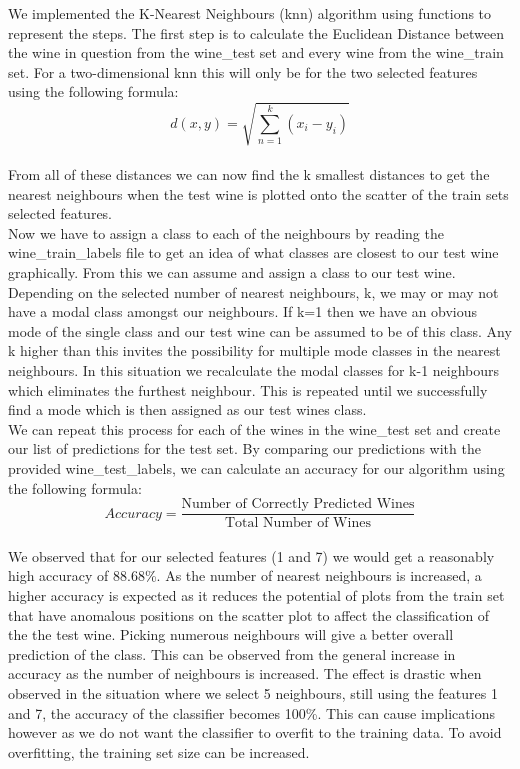 \documentclass[10pt]{article}
\begin{document}
We implemented the K-Nearest Neighbours (knn) algorithm using functions to represent the steps. The first step is to calculate the Euclidean Distance between the wine in question from the wine\_test set and every wine from the wine\_train set. For a two-dimensional knn this will only be for the two selected features using the following formula:
$$d(x,y) = \sqrt{\sum_{n=1}^{k} (x_i - y_i)}$$
\\
\noindent
From all of these distances we can now find the k smallest distances to get the nearest neighbours when the test wine is plotted onto the scatter of the train sets selected features.\\

\noindent
Now we have to assign a class to each of the neighbours by reading the wine\_train\_labels file to get an idea of what classes are closest to our test wine graphically. From this we can assume and assign a class to our test wine. Depending on the selected number of nearest neighbours, k, we may or may not have a modal class amongst our neighbours. If k=1 then we have an obvious mode of the single class and our test wine can be assumed to be of this class. Any k higher than this invites the possibility for multiple mode classes in the nearest neighbours. In this situation we recalculate the modal classes for k-1 neighbours which eliminates the furthest neighbour. This is repeated until we successfully find a mode which is then assigned as our test wines class.\\

\noindent
We can repeat this process for each of the wines in the wine\_test set and create our list of predictions for the test set. By comparing our predictions with the provided wine\_test\_labels, we can calculate an accuracy for our algorithm using the following formula:
$$Accuracy = \frac{\text{Number of Correctly Predicted Wines}}{\text{Total Number of Wines}}$$
\\
\noindent
We observed that for our selected features (1 and 7) we would get a reasonably high accuracy of 88.68\%. As the number of nearest neighbours is increased, a higher accuracy is expected as it reduces the potential of plots from the train set that have anomalous positions on the scatter plot to affect the classification of the the test wine. Picking numerous neighbours will give a better overall prediction of the class. This can be observed from the general increase in accuracy as the number of neighbours is increased. The effect is drastic when observed in the situation where we select 5 neighbours, still using the features 1 and 7, the accuracy of the classifier becomes 100\%. This can cause implications however as we do not want the classifier to overfit to the training data. To avoid overfitting, the training set size can be increased.\\
\end{document}
